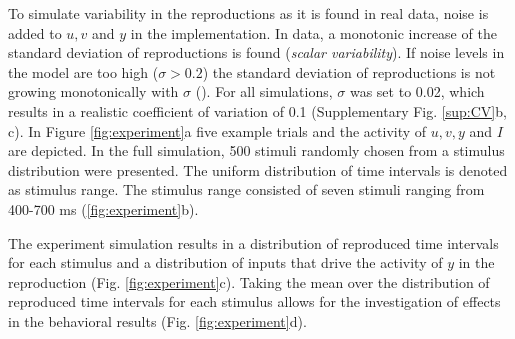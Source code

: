 \documentclass[10pt]{article}
\begin{document}
To simulate variability in the reproductions as it is found in real data, noise is added to $u, v$ and $y$ in the implementation. In data, a monotonic increase of the standard deviation of reproductions is found (\textit{scalar variability}). 
If noise levels in the model are too high ($\sigma>0.2$) the standard deviation of reproductions is not growing monotonically with $\sigma$ (\cite{Egger2020}).
For all simulations, $\sigma$ was set to 0.02, which results in a realistic coefficient of variation of 0.1 (Supplementary Fig. \ref{sup:CV}b, c).
In Figure \ref{fig:experiment}a five example trials and the activity of $u, v, y$ and $I$ are depicted. 
In the full simulation, 500 stimuli randomly chosen from a stimulus distribution were presented. The uniform distribution of time intervals is denoted as stimulus range. 
The stimulus range consisted of seven stimuli ranging from 400-700 ms (\ref{fig:experiment}b).

The experiment simulation results in a distribution of reproduced time intervals for each stimulus and a distribution of inputs that drive the activity of $y$ in the reproduction (Fig. \ref{fig:experiment}c).
Taking the mean over the distribution of reproduced time intervals for each stimulus allows for the investigation of effects in the behavioral results (Fig. \ref{fig:experiment}d). 
\end{document}
